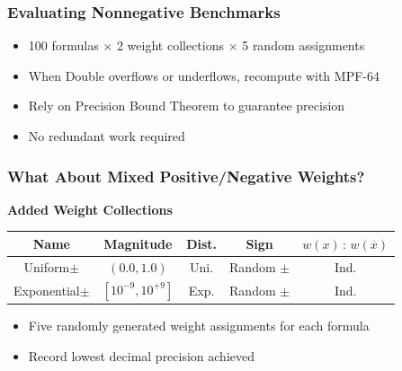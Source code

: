 \documentclass[t,pdf]{beamer}
\newcommand{\obar}[1]{\overline{#1}}
\begin{document}
\begin{frame}

\frametitle{Evaluating Nonnegative Benchmarks}

\bigskip


\medskip

\begin{itemize}
\item 100 formulas $\times$ 2 weight collections $\times$ 5 random assignments
\item When Double overflows or underflows, recompute with MPF-64
\item Rely on Precision Bound Theorem to guarantee precision
\item No redundant work required
\end{itemize}

\end{frame}


\begin{frame}
  \frametitle{What About Mixed Positive/Negative Weights?}

\medskip

  \textbf{Added Weight Collections}

\begin{center}
   \begin{tabular}{ccccc}
     Name & Magnitude  & Dist. & Sign & $w(x)\,:\,w(\obar{x})$ \\
     \midrule
     Uniform$\pm$      & $(0.0, 1.0)$     & Uni.  & Random $\pm$   & Ind. \\[0.5em]
     Exponential$\pm$ & $[10^{-9}, 10^{+9}]$ & Exp. & Random $\pm$ & Ind. \\
   \end{tabular}
\end{center}

  \begin{itemize}
    \item Five randomly generated weight assignments for each formula
    \item Record lowest decimal precision achieved
  \end{itemize}

\end{frame}
\end{document}

